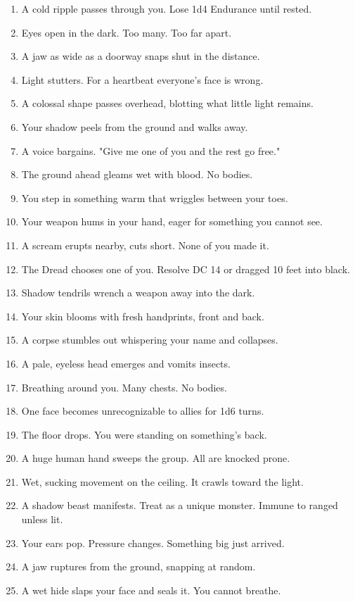 \documentclass[10pt,twoside]{article}
\begin{document}
\begin{multicols}{2}
{\begin{enumerate}
\item A cold ripple passes through you. Lose 1d4 Endurance until rested.
\item Eyes open in the dark. Too many. Too far apart.
\item A jaw as wide as a doorway snaps shut in the distance.
\item Light stutters. For a heartbeat everyone's face is wrong.
\item A colossal shape passes overhead, blotting what little light remains.
\item Your shadow peels from the ground and walks away.
\item A voice bargains. "Give me one of you and the rest go free."
\item The ground ahead gleams wet with blood. No bodies.
\item You step in something warm that wriggles between your toes.
\item Your weapon hums in your hand, eager for something you cannot see.
\item A scream erupts nearby, cuts short. None of you made it.
\item The Dread chooses one of you. Resolve DC 14 or dragged 10 feet into black.
\item Shadow tendrils wrench a weapon away into the dark.
\item Your skin blooms with fresh handprints, front and back.
\item A corpse stumbles out whispering your name and collapses.
\item A pale, eyeless head emerges and vomits insects.
\item Breathing around you. Many chests. No bodies.
\item One face becomes unrecognizable to allies for 1d6 turns.
\item The floor drops. You were standing on something's back.
\item A huge human hand sweeps the group. All are knocked prone.
\item Wet, sucking movement on the ceiling. It crawls toward the light.
\item A shadow beast manifests. Treat as a unique monster. Immune to ranged unless lit.
\item Your ears pop. Pressure changes. Something big just arrived.
\item A jaw ruptures from the ground, snapping at random.
\item A wet hide slaps your face and seals it. You cannot breathe.

\end{enumerate}}
\end{multicols}
\end{document}
